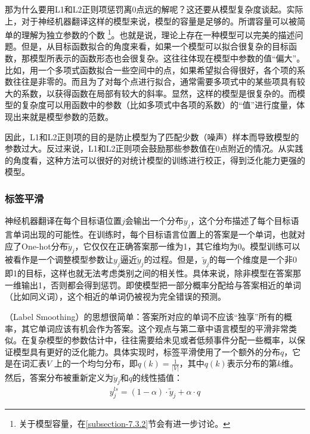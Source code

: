 \parinterval 那为什么要用L1和L2正则项惩罚离0点远的解呢？这还要从模型复杂度谈起。实际上，对于神经机器翻译这样的模型来说，模型的容量是足够的。所谓容量可以被简单的理解为独立参数的个数 \footnote{关于模型容量，在\ref{subsection-7.3.2}节会有进一步讨论。}。也就是说，理论上存在一种模型可以完美的描述问题。但是，从目标函数拟合的角度来看，如果一个模型可以拟合很复杂的目标函数，那模型所表示的函数形态也会很复杂。这往往体现在模型中参数的值``偏大''。比如，用一个多项式函数拟合一些空间中的点，如果希望拟合得很好，各个项的系数往往是非零的。而且为了对每个点进行拟合，通常需要多项式中的某些项具有较大的系数，以获得函数在局部有较大的斜率。显然，这样的模型是很复杂的。而模型的复杂度可以用函数中的参数（比如多项式中各项的系数）的``值''进行度量，体现出来就是模型参数的范数。

\parinterval 因此，L1和L2正则项的目的是防止模型为了匹配少数（噪声）样本而导致模型的参数过大。反过来说，L1和L2正则项会鼓励那些参数值在0点附近的情况。从实践的角度看，这种方法可以很好的对统计模型的训练进行校正，得到泛化能力更强的模型。


\subsubsection{标签平滑}

\parinterval 神经机器翻译在每个目标语位置$j$会输出一个分布$y_j$，这个分布描述了每个目标语言单词出现的可能性。在训练时，每个目标语言位置上的答案是一个单词，也就对应了One-hot分布$\tilde{y}_j$，它仅仅在正确答案那一维为1，其它维均为0。模型训练可以被看作是一个调整模型参数让$y_j$逼近$\tilde{y}_j$的过程。但是，$\tilde{y}_j$的每一个维度是一个非0即1的目标，这样也就无法考虑类别之间的相关性。具体来说，除非模型在答案那一维输出1，否则都会得到惩罚。即使模型把一部分概率分配给与答案相近的单词（比如同义词），这个相近的单词仍被视为完全错误的预测。

（Label Smoothing）的思想很简单\cite{Szegedy_2016_CVPR}：答案所对应的单词不应该``独享''所有的概率，其它单词应该有机会作为答案。这个观点与第二章中语言模型的平滑非常类似。在复杂模型的参数估计中，往往需要给未见或者低频事件分配一些概率，以保证模型具有更好的泛化能力。具体实现时，标签平滑使用了一个额外的分布$q$，它是在词汇表$V$ 上的一个均匀分布，即$q(k)=\frac{1}{|V|}$，其中$q(k)$表示分布的第$k$维。然后，答案分布被重新定义为$\tilde{y}_j$和$q$的线性插值：
\begin{eqnarray}
y_{j}^{ls}=(1-\alpha) \cdot \tilde{y}_j + \alpha \cdot q
\label{eq:7-5}
\end{eqnarray}

